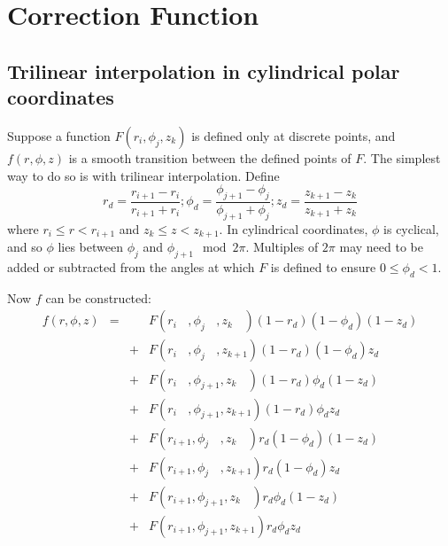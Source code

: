 \documentclass[herrin-thesis.tex]{subfiles}
\begin{document}
\section{Correction Function}

\subsection{Trilinear interpolation in cylindrical polar coordinates}
Suppose a function \(F(r_i, \phi_j, z_k)\) is defined only at discrete points, and \(f(r, \phi, z)\) is a smooth transition between the defined points of \(F\). The simplest way to do so is with trilinear interpolation. Define
\begin{equation}
r_d = \frac{r_{i+1} - r_{i}}{r_{i+1}+r_{i}} ; \phi_d = \frac{\phi_{j+1} - \phi_{j}}{\phi_{j+1}+\phi_{j}}; z_d = \frac{z_{k+1} - z_{k}}{z_{k+1}+z_{k}}
\label{eq:lightmap_interpolation_weights}
\end{equation}
where \(r_i \leq r < r_{i+1}\) and \(z_k \leq z < z_{k+1}\). In cylindrical coordinates, \(\phi\) is cyclical, and so \(\phi\) lies between \(\phi_j\) and \(\phi_{j+1} \mod 2\pi\). Multiples of \(2\pi\) may need to be added or subtracted from the angles at which \(F\) is defined to ensure \(0 \leq \phi_d < 1\).

Now \(f\) can be constructed:
\begin{align}
f(r, \phi, z) &=&   & F(r_{i\phantom{+1}}, \phi_{j\phantom{+1}}, z_{k\phantom{+1}}) (1-r_d)(1-\phi_d)(1-z_d)	\nonumber\\
		& & + & F(r_{i\phantom{+1}}, \phi_{j\phantom{+1}}, z_{k+1})		     (1-r_d)(1-\phi_d)z_d 		\nonumber\\
		& & + & F(r_{i\phantom{+1}}, \phi_{j+1},		      z_{k\phantom{+1}}) (1-r_d)\phi_d(1-z_d)		\nonumber\\
		& & + & F(r_{i\phantom{+1}}, \phi_{j+1}, 		      z_{k+1})		     (1-r_d)\phi_d z_d			\nonumber\\
		& & + & F(r_{i+1}, 		     \phi_{j\phantom{+1}}, z_{k\phantom{+1}}) r_d(1-\phi_d)(1-z_d)		\nonumber\\
		& & + & F(r_{i+1}, 		     \phi_{j\phantom{+1}}, z_{k+1})		     r_d(1-\phi_d)z_d			\nonumber\\
		& & + & F(r_{i+1}, 		     \phi_{j+1}, 		      z_{k\phantom{+1}})  r_d\phi_d(1-z_d)			\nonumber\\
		& & + & F(r_{i+1},		     \phi_{j+1}, 		      z_{k+1})		      r_d\phi_dz_d
\label{eq:lightmap_trilinear}
\end{align}
\end{document}
